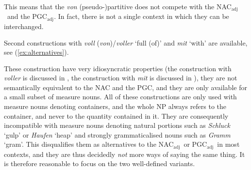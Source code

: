\documentclass[USenglish]{article}
\newcommand{\Sub}[1]{\ensuremath{\mathrm{_{#1}}}}
\newcommand{\NACa}{NAC\Sub{adj}}
\newcommand{\PGCa}{PGC\Sub{adj}}
\begin{document}
\begin{exe}
  \ex\label{ex:analyticalpartitive} 
  \begin{xlist}
  \end{xlist}
\end{exe}

This means that the \textit{von} (pseudo-)partitive does not compete with the \NACa\ and the \PGCa.
In fact, there is not a single context in which they can be interchanged. 

Second constructions with \textit{voll} (\textit{von})\slash\textit{voller} `full (of)' and \textit{mit} `with' are available, see (\ref{ex:alternatives}).

\begin{exe}
  \ex\label{ex:alternatives}
  \begin{xlist}
  \end{xlist}
\end{exe}

These construction have very idiosyncratic properties (the construction with \textit{voller} is discussed in \citealp{Zeldes2018}, the construction with \textit{mit} is discussed in \citealp{Bhatt1990}), they are not semantically equivalent to the NAC and the PGC, and they are only available for a small subset of measure nouns.
All of these constructions are only used with measure nouns denoting containers, and the whole NP always refers to the container, and never to the quantity contained in it.
They are consequently incompatible with measure nouns denoting natural portions such as \textit{Schluck} `gulp' or \textit{Haufen} `heap' and strongly grammaticalised nouns such as \textit{Gramm} `gram'.
This disqualifies them as alternatives to the \NACa\ or \PGCa\ in most contexts, and they are thus decidedly \textit{not} more ways of saying the same thing. 
It is therefore reasonable to focus on the two well-defined variants.
\end{document}
